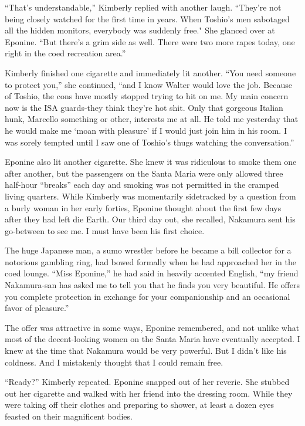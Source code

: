 \documentclass[]{article}
\begin{document}
{“That’s understandable,” Kimberly replied with another laugh.  “They’re not being closely watched for the first time in years.  When Toshio’s men sabotaged all the hidden monitors, everybody was suddenly free."  She glanced over at Eponine.  “But there’s a grim side as well.  There were two more rapes today, one right in the coed recreation area.”

Kimberly finished one cigarette and immediately lit another.  “You need someone to protect you,” she continued, “and I know Walter would love the job.  Because of Toshio, the cons have mostly stopped trying to hit on me.  My main concern now is the ISA guards-they think they’re hot shit.  Only that gorgeous Italian hunk, Marcello something or other, interests me at all.  He told me yesterday that he would make me ‘moan with pleasure’ if I would just join him in his room.  I was sorely tempted until I saw one of Toshio’s thugs watching the conversation.”

Eponine also lit another cigarette.  She knew it was ridiculous to smoke them one after another, but the passengers on the Santa Maria were only allowed three half-hour “breaks” each day and smoking was not permitted in the cramped living quarters.  While Kimberly was momentarily sidetracked by a question from a burly woman in her early forties, Eponine thought about the first few days after they had left die Earth.  Our third day out, she recalled, Nakamura sent his go-between to see me.  I must have been his first choice.

The huge Japanese man, a sumo wrestler before he became a bill collector for a notorious gambling ring, had bowed formally when he had approached her in the coed lounge.  “Miss Eponine,” he had said in heavily accented English, “my friend Nakamura-san has asked me to tell you that he finds you very beautiful.  He offers you complete protection in exchange for your companionship and an occasional favor of pleasure.”

The offer was attractive in some ways, Eponine remembered, and not unlike what most of the decent-looking women on the Santa Maria have eventually accepted.  I knew at the time that Nakamura would be very powerful.  But I didn’t like his coldness.  And I mistakenly thought that I could remain free.

“Ready?” Kimberly repeated.  Eponine snapped out of her reverie.  She stubbed out her cigarette and walked with her friend into the dressing room.  While they were taking off their clothes and preparing to shower, at least a dozen eyes feasted on their magnificent bodies.

}
\end{document}
